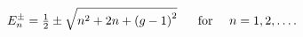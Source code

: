 \begin{equation}
\label{specf=mu}
E_n^\pm = \tfrac{1}{2} \pm \sqrt{n^2 +2n + \left(g-1 \right)^2}
~~~~~{\rm for}~~~~n = 1,2,\dots.
\end{equation}

